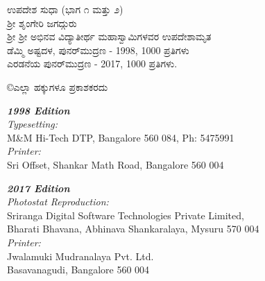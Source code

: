 \begin{center}
ಉಪದೇಶ ಸುಧಾ (ಭಾಗ ೧ ಮತ್ತು ೨)\\
ಶ್ರೀ ಶೃಂಗೇರಿ ಜಗದ್ಗುರು\\
ಶ್ರೀ ಶ್ರೀ ಅಭಿನವ ವಿದ್ಯಾತೀರ್ಥ ಮಹಾಸ್ವಾಮಿಗಳವರ ಉಪದೇಶಾಮೃತ\\
ಡೆಮ್ಮಿ ಅಷ್ಟದಳ, ಪುನರ್​ಮುದ್ರಣ - 1998, 1000  ಪ್ರತಿಗಳು\\ 
ಎರಡನೆಯ ಪುನರ್​ಮುದ್ರಣ - 2017, 1000  ಪ್ರತಿಗಳು. 
\end{center}
\vfill

\noindent
{\eng\copyright}ಎಲ್ಲಾ ಹಕ್ಕುಗಳೂ ಪ್ರಕಾಶಕರದು
\vfill

\noindent
\bgroup
{\sl\eng\bfseries 1998 Edition}\\
{\sl\eng Typesetting:}\\
{\eng M\&M Hi-Tech DTP, Bangalore 560 084, Ph: 5475991}\\
{\sl\eng Printer:}\\
{\eng Sri Offset, Shankar Math Road, Bangalore 560 004}
\bigskip

\noindent
{\sl\eng\bfseries 2017 Edition}\\
{\sl\eng Photostat Reproduction:}\\
{\eng Sriranga Digital Software Technologies Private Limited,\\ 
Bharati Bhavana, Abhinava Shankaralaya, Mysuru 570 004}\\
{\sl\eng Printer:}\\
{\eng Jwalamuki Mudranalaya Pvt. Ltd.\\
Basavanagudi, Bangalore 560 004}
